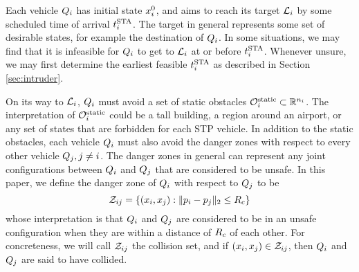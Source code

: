 Each vehicle $Q_i$ has initial state $x^0_i$, and aims to reach its target $\mathcal{L}_i$ by some scheduled time of arrival $t^\text{STA}_i$. The target in general represents some set of desirable states, for example the destination of $Q_i$. %
In some situations, we may find that it is infeasible for $Q_i$ to get to $\mathcal{L}_i$ at or before $t^\text{STA}_i$. Whenever unsure, we may first determine the earliest feasible $t^\text{STA}_i$ as described in Section \ref{sec:intruder}. 

On its way to $\mathcal{L}_i$, $Q_i$ must avoid a set of static obstacles $\mathcal{O}^\text{static}_i \subset \mathbb{R}^{n_i}$. The interpretation of $\mathcal{O}^\text{static}_i$ could be a tall building, a region around an airport, or any set of states that are forbidden for each STP vehicle. In addition to the static obstacles, each vehicle $Q_i$ must also avoid the danger zones with respect to every other vehicle $Q_j, j\neq i$. The danger zones in general can represent any joint configurations between $Q_i$ and $Q_j$ that are considered to be unsafe. In this paper, we define the danger zone of $Q_i$ with respect to $Q_j$ to be
%
\begin{equation}
\mathcal{Z}_{ij} = \{(x_i, x_j): \|p_i - p_j\|_2 \le R_c\}
\end{equation}
%
\noindent whose interpretation is that $Q_i$ and $Q_j$ are considered to be in an unsafe configuration when they are within a distance of $R_c$ of each other. For concreteness, we will call $\mathcal{Z}_{ij}$ the collision set, and if $(x_i, x_j) \in \mathcal{Z}_{ij}$, then $Q_i$ and $Q_j$ are said to have collided.  

